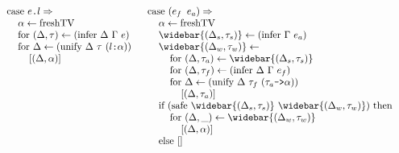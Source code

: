 \documentclass[acmsmall]{acmart}
\begin{document}
\begin{figure*}[h]
\[\begin{array}[t]{@{} l}
    \I \text{case } \code{$e$.$l$} \Rightarrow  
    \\
    \I\I \alpha \leftarrow \text{freshTV}
    \\
    \I\I \text{for } (\Delta, \tau) \leftarrow (\text{infer } \Delta\ \Gamma\ e)
    \\
    \I\I \text{for } \Delta \leftarrow (\text{unify } \Delta\ \tau\ (\code{$l$:$\alpha$}))
    \\
    \I\I\I [(\Delta, \alpha)]
\end{array}
\begin{array}[t]{@{} l}
    \I \text{case } (\code{$e_f$ $e_a$}) \Rightarrow  
    \\
    \I\I \alpha \leftarrow \text{freshTV}
    \\
    \I\I \widebar{(\Delta_s, \tau_s)} \leftarrow (\text{infer } \Gamma\ e_a)
    \\
    \I\I \widebar{(\Delta_w, \tau_w)} \leftarrow
    \\
    \I\I\I \text{for } (\Delta, \tau_a) \leftarrow \widebar{(\Delta_s, \tau_s)}
    \\
    \I\I\I \text{for } (\Delta, \tau_f) \leftarrow (\text{infer } \Delta\ \Gamma\ e_f)
    \\
    \I\I\I \text{for } \Delta \leftarrow (\text{unify } \Delta\ \tau_f\ (\code{$\tau_a$->$\alpha$}))
    \\
    \I\I\I\I [(\Delta, \tau_a)]
    \\
    \I\I \text{if } (\text{safe } \widebar{(\Delta_s, \tau_s)}\ \widebar{(\Delta_w, \tau_w)} ) \text{ then }
    \\
    \I\I\I \text{for } (\Delta, \_) \leftarrow \widebar{(\Delta_w, \tau_w)}
    \\
    \I\I\I\I [(\Delta, \alpha)]
    \\
    \I\I \text{else } [] 

    \\


\end{array}\]
\end{figure*}
\end{document}
